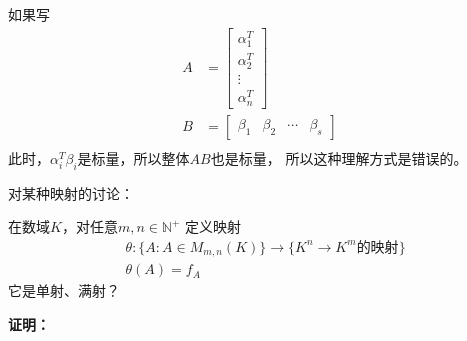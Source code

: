 \documentclass{article}
\begin{document}
\begin{itemize}
        如果写
        \begin{align*}
          A & = \begin{bmatrix}
                  \alpha_1^T \\
                  \alpha_2^T \\
                  \vdots     \\
                  \alpha_n^T
                \end{bmatrix}                       \\
          B & = \begin{bmatrix}
                  \beta_1 & \beta_2 & \cdots & \beta_s
                \end{bmatrix} \\
        \end{align*}
        此时，$\alpha_i^T \beta_i$是标量，所以整体$AB$也是标量，
        所以这种理解方式是错误的。


\end{itemize}

\begin{zremark}
  对某种映射的讨论：

  在数域$K$，对任意$m,n \in \mathbb{N}^+$
  定义映射
  \begin{align*}
     & \theta     :  \{A: A \in M_{m,n}(K)\} \to \{K^n \to K^m \text{的映射}\} \\
     & \theta(A)  = f_A
  \end{align*}
  它是单射、满射？
\end{zremark}

\textbf{证明：}
\end{document}
